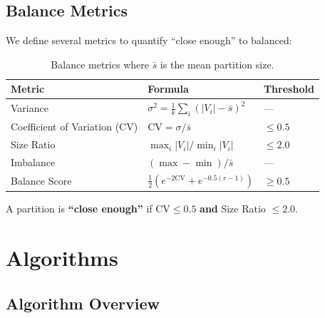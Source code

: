 \documentclass[11pt,a4paper]{article}
\theoremstyle{definition}
\theoremstyle{plain}
\theoremstyle{remark}
\newcommand{\CV}{\mathrm{CV}}
\begin{document}
\subsection{Balance Metrics}

We define several metrics to quantify ``close enough'' to balanced:

\begin{table}[h]
\centering
\begin{tabular}{lll}
\toprule
\textbf{Metric} & \textbf{Formula} & \textbf{Threshold} \\
\midrule
Variance & $\sigma^2 = \frac{1}{k}\sum_i (|V_i| - \bar{s})^2$ & — \\
Coefficient of Variation (CV) & $\CV = \sigma / \bar{s}$ & $\leq 0.5$ \\
Size Ratio & $\max_i |V_i| / \min_i |V_i|$ & $\leq 2.0$ \\
Imbalance & $(\max - \min) / \bar{s}$ & — \\
Balance Score & $\frac{1}{2}(e^{-2\CV} + e^{-0.5(r-1)})$ & $\geq 0.5$ \\
\bottomrule
\end{tabular}
\caption{Balance metrics where $\bar{s}$ is the mean partition size.}
\end{table}

A partition is \textbf{``close enough''} if $\CV \leq 0.5$ \textbf{and}
Size Ratio $\leq 2.0$.

\section{Algorithms}

\subsection{Algorithm Overview}
\end{document}
